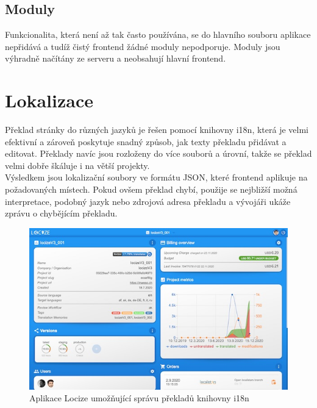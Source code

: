 \subsection{Moduly}
Funkcionalita, která není až tak často používána, se do hlavního souboru aplikace
nepřidává a tudíž čistý frontend žádné moduly nepodporuje. Moduly jsou výhradně načítány
ze serveru a neobsahují hlavní frontend.

\section{Lokalizace}
Překlad stránky do různých jazyků je řešen pomocí knihovny i18n, která je velmi efektivní a
zároveň poskytuje snadný způsob, jak texty překladu přidávat a editovat. 
Překlady navíc jsou rozloženy do více souborů a úrovní, takže se překlad velmi dobře
škáluje i na větší projekty.\\
Výsledkem jsou lokalizační soubory ve formátu JSON, které frontend aplikuje na požadovaných
místech. Pokud ovšem překlad chybí, použije se nejbližší možná interpretace, podobný jazyk nebo
zdrojová adresa překladu a vývojáři ukáže zprávu o chybějícím překladu.
\begin{figure}[H]
	\centering
	\includegraphics[width=.7\linewidth]{img/locize.jpg}
	\caption[Aplikace Locize umožňující správu překladů knihovny i18n, zdroj: \url{https://locize.com/}]{Aplikace Locize umožňující správu překladů knihovny i18n}
\end{figure}